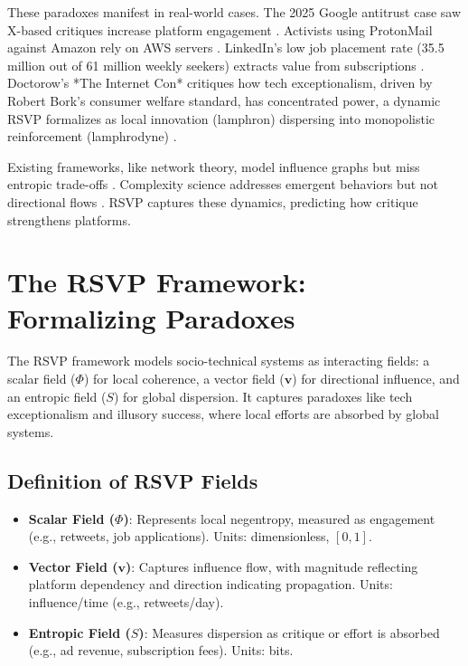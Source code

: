 \documentclass{article}
\begin{document}
These paradoxes manifest in real-world cases. The 2025 Google antitrust case saw X-based critiques increase platform engagement \cite{doj2025}. Activists using ProtonMail against Amazon rely on AWS servers \cite{amazon2025}. LinkedIn’s low job placement rate (35.5 million out of 61 million weekly seekers) extracts value from subscriptions \cite{kinsta2025linkedin}. Doctorow’s *The Internet Con* critiques how tech exceptionalism, driven by Robert Bork’s consumer welfare standard, has concentrated power, a dynamic RSVP formalizes as local innovation (lamphron) dispersing into monopolistic reinforcement (lamphrodyne) \cite{doctorow2023internetcon}.

Existing frameworks, like network theory, model influence graphs but miss entropic trade-offs \cite{newman2010networks}. Complexity science addresses emergent behaviors but not directional flows \cite{mitchell2009complexity}. RSVP captures these dynamics, predicting how critique strengthens platforms.

\section{The RSVP Framework: Formalizing Paradoxes}
\label{sec:rsvp}

The RSVP framework models socio-technical systems as interacting fields: a scalar field ($\Phi$) for local coherence, a vector field ($\mathbf{v}$) for directional influence, and an entropic field ($S$) for global dispersion. It captures paradoxes like tech exceptionalism and illusory success, where local efforts are absorbed by global systems.

\subsection{Definition of RSVP Fields}

\begin{itemize}
    \item \textbf{Scalar Field ($\Phi$)}: Represents local negentropy, measured as engagement (e.g., retweets, job applications). Units: dimensionless, $[0,1]$.
    \item \textbf{Vector Field ($\mathbf{v}$)}: Captures influence flow, with magnitude reflecting platform dependency and direction indicating propagation. Units: influence/time (e.g., retweets/day).
    \item \textbf{Entropic Field ($S$)}: Measures dispersion as critique or effort is absorbed (e.g., ad revenue, subscription fees). Units: bits.
\end{itemize}
\end{document}
